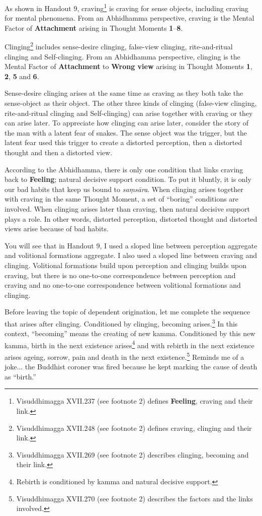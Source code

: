 As shown in Handout 9, craving\footnote{Visuddhimagga XVII.237 (see footnote 2) defines \textbf{Feeling}, craving and their link.} is craving for sense objects, including craving for mental phenomena. From an Abhidhamma perspective, craving is the Mental Factor of \textbf{Attachment} arising in Thought Moments \textbf{1}--\textbf{8}.

Clinging\footnote{Visuddhimagga XVII.248 (see footnote 2) defines craving, clinging and their link.} includes sense-desire clinging, false-view clinging, rite-and-ritual clinging and Self-clinging. From an Abhidhamma perspective, clinging is the Mental Factor of \textbf{Attachment} to \textbf{Wrong view} arising in Thought Moments \textbf{1}, \textbf{2}, \textbf{5} and \textbf{6}.

Sense-desire clinging arises at the same time as craving as they both take the sense-object as their object. The other three kinds of clinging (false-view clinging, rite-and-ritual clinging and Self-clinging) can arise together with craving or they can arise later. To appreciate how clinging can arise later, consider the story of the man with a latent fear of snakes. The sense object was the trigger, but the latent fear used this trigger to create a distorted perception, then a distorted thought and then a distorted view.

According to the Abhidhamma, there is only one condition that links craving back to \textbf{Feeling}; natural decisive support condition. To put it bluntly, it is only our bad habits that keep us bound to \textit{saṃsāra}. When clinging arises together with craving in the same Thought Moment, a set of “boring” conditions are involved. When clinging arises later than craving, then natural decisive support plays a role. In other words, distorted perception, distorted thought and distorted views arise because of bad habits.

You will see that in Handout 9, I used a sloped line between perception aggregate and volitional formations aggregate. I also used a sloped line between craving and clinging. Volitional formations build upon perception and clinging builds upon craving, but there is no one-to-one correspondence between perception and craving and no one-to-one correspondence between volitional formations and clinging.

Before leaving the topic of dependent origination, let me complete the sequence that arises after clinging. Conditioned by clinging, becoming arises.\footnote{Visuddhimagga XVII.269 (see footnote 2) describes clinging, becoming and their link.} In this context, “becoming” means the creating of new kamma. Conditioned by this new kamma, birth in the next existence arises\footnote{Rebirth is conditioned by kamma and natural decisive support.} and with rebirth in the next existence arises ageing, sorrow, pain and death in the next existence.\footnote{Visuddhimagga XVII.270 (see footnote 2) describes the factors and the links involved.} Reminds me of a joke... the Buddhist coroner was fired because he kept marking the cause of death as “birth.” 

